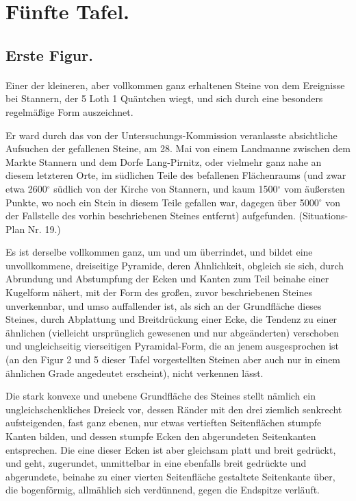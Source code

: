 \documentclass[a4paper, 11pt, oneside, german]{article}
\begin{document}
\section{Fünfte Tafel.}
\subsection{Erste Figur.}
\paragraph{}
Einer der kleineren, aber vollkommen ganz erhaltenen Steine von dem Ereignisse bei Stannern, der 5 Loth 1 Quäntchen wiegt, und sich durch eine besonders regelmäßige Form auszeichnet.

Er ward durch das von der Untersuchungs-Kommission veranlasste absichtliche Aufsuchen der gefallenen Steine, am 28. Mai von einem Landmanne zwischen dem Markte Stannern und dem Dorfe Lang-Pirnitz, oder vielmehr ganz nahe an diesem letzteren Orte, im südlichen Teile des befallenen Flächenraums (und zwar etwa 2600$^{\circ}$ südlich von der Kirche von Stannern, und kaum 1500$^{\circ}$ vom äußersten Punkte, wo noch ein Stein in diesem Teile gefallen war, dagegen über 5000$^{\circ}$ von der Fallstelle des vorhin beschriebenen Steines entfernt) aufgefunden. (Situations-Plan Nr. 19.)

Es ist derselbe vollkommen ganz, um und um überrindet, und bildet eine unvollkommene, dreiseitige Pyramide, deren Ähnlichkeit, obgleich sie sich, durch Abrundung und Abstumpfung der Ecken und Kanten zum Teil beinahe einer Kugelform nähert, mit der Form des großen, zuvor beschriebenen Steines unverkennbar, und umso auffallender ist, als sich an der Grundfläche dieses Steines, durch Abplattung und Breitdrückung einer Ecke, die Tendenz zu einer ähnlichen (vielleicht ursprünglich gewesenen und nur abgeänderten) verschoben und ungleichseitig vierseitigen Pyramidal-Form, die an jenem ausgesprochen ist (an den Figur 2 und 5 dieser Tafel vorgestellten Steinen aber auch nur in einem ähnlichen Grade angedeutet erscheint), nicht verkennen lässt.

Die stark konvexe und unebene Grundfläche des Steines stellt nämlich ein ungleichschenkliches Dreieck vor, dessen Ränder mit den drei ziemlich senkrecht aufsteigenden, fast ganz ebenen, nur etwas vertieften Seitenflächen stumpfe Kanten bilden, und dessen stumpfe Ecken den abgerundeten Seitenkanten entsprechen. Die eine dieser Ecken ist aber gleichsam platt und breit gedrückt, und geht, zugerundet, unmittelbar in eine ebenfalls breit gedrückte und abgerundete, beinahe zu einer vierten Seitenfläche gestaltete Seitenkante über, die bogenförmig, allmählich sich verdünnend, gegen die Endspitze verläuft.
\end{document}

